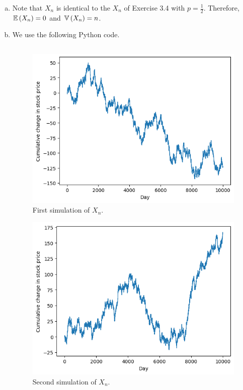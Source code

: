 \begin{ex}
  \begin{enumerate}[(a)]
    \item Note that $X_n$ is identical to the $X_n$ of Exercise 3.4 with
          $p=\frac{1}{2}$. Therefore, $\mathbb{E}\left(X_n\right)=0$ and $\mathbb{V}\left(X_n\right)=n$.
    \item We use the following Python code.
          \inputminted{python}{../code/03-11.py}

          \begin{figure}[H]
            \centering
            \includegraphics[scale=0.8]{../images/03-11a}
            \caption{First simulation of $X_n$.}
          \end{figure}

          \begin{figure}[H]
            \centering
            \includegraphics[scale=0.8]{../images/03-11b}
            \caption{Second simulation of $X_n$.}
          \end{figure}


\end{enumerate}
\end{ex}
